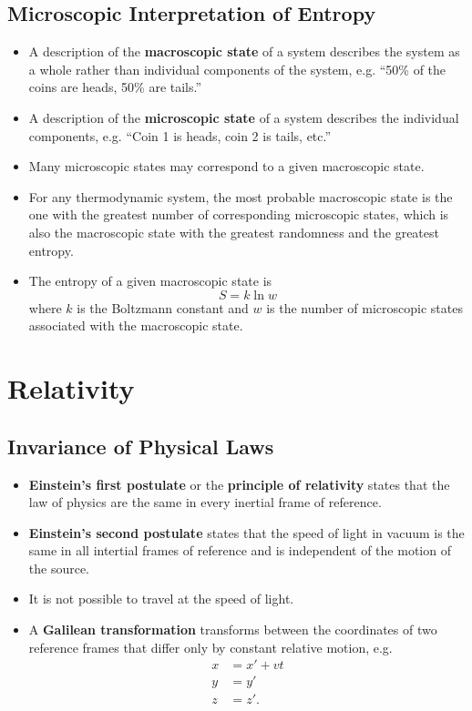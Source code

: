 \documentclass{article}
\begin{document}
\subsection{Microscopic Interpretation of Entropy}

\begin{itemize}
  \item A description of the \textbf{macroscopic state} of a system describes the system as a whole rather than individual components of the system, e.g. ``50\% of the coins are heads, 50\% are tails.''

  \item A description of the \textbf{microscopic state} of a system describes the individual components, e.g. ``Coin 1 is heads, coin 2 is tails, etc.''

  \item Many microscopic states may correspond to a given macroscopic state.

  \item For any thermodynamic system, the most probable macroscopic state is the one with the greatest number of corresponding microscopic states, which is also the macroscopic state with the greatest randomness and the greatest entropy.

  \item The entropy of a given macroscopic state is \[S = k \ln w\] where $k$ is the Boltzmann constant and $w$ is the number of microscopic states associated with the macroscopic state.
\end{itemize}

\setcounter{section}{36}
\section{Relativity}

\subsection{Invariance of Physical Laws}

\begin{itemize}
  \item \textbf{Einstein's first postulate} or the \textbf{principle of relativity} states that the law of physics are the same in every inertial frame of reference.

  \item \textbf{Einstein's second postulate} states that the speed of light in vacuum is the same in all intertial frames of reference and is independent of the motion of the source.

  \item It is not possible to travel at the speed of light.

  \item A \textbf{Galilean transformation} transforms between the coordinates of two reference frames that differ only by constant relative motion, e.g. \begin{align*}
          x & = x' + v t \\
          y & = y'       \\
          z & = z'.
        \end{align*}
\end{itemize}
\end{document}
